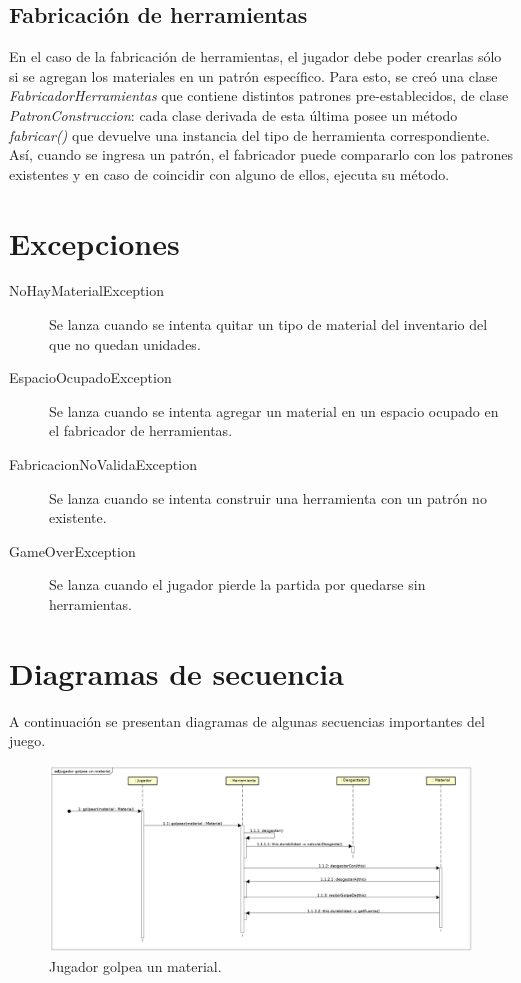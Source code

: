 \documentclass[titlepage,a4paper]{article}
\begin{document}
\subsection{Fabricación de herramientas}
	En el caso de la fabricación de herramientas, el jugador debe poder crearlas sólo si se agregan los materiales en un patrón específico. Para esto, se creó una clase \emph{FabricadorHerramientas} que contiene distintos patrones pre-establecidos, de clase \emph{PatronConstruccion}: cada clase derivada de esta última posee un método \emph{fabricar()} que devuelve una instancia del tipo de herramienta correspondiente. Así, cuando se ingresa un patrón, el fabricador puede compararlo con los patrones existentes y en caso de coincidir con alguno de ellos, ejecuta su método.

\section{Excepciones}\label{sec:excepciones}
\begin{description}
	\item[NoHayMaterialException] Se lanza cuando se intenta quitar un tipo de material del inventario del que no quedan unidades.
	\item[EspacioOcupadoException] Se lanza cuando se intenta agregar un material en un espacio ocupado en el fabricador de herramientas.
	\item[FabricacionNoValidaException] Se lanza cuando se intenta construir una herramienta con un patrón no existente.
	\item[GameOverException] Se lanza cuando el jugador pierde la partida por quedarse sin herramientas.
\end{description}

\section{Diagramas de secuencia}\label{sec:diagramasdesecuencia}
A continuación se presentan diagramas de algunas secuencias importantes del juego.

\begin{figure}[H]
\centering
\includegraphics[width=\textwidth]{Diagramas/JugadorGolpeaMaterial.png}
\caption{\label{fig:jugadorGolpeaMaterial}Jugador golpea un material.}
\end{figure}
\end{document}

